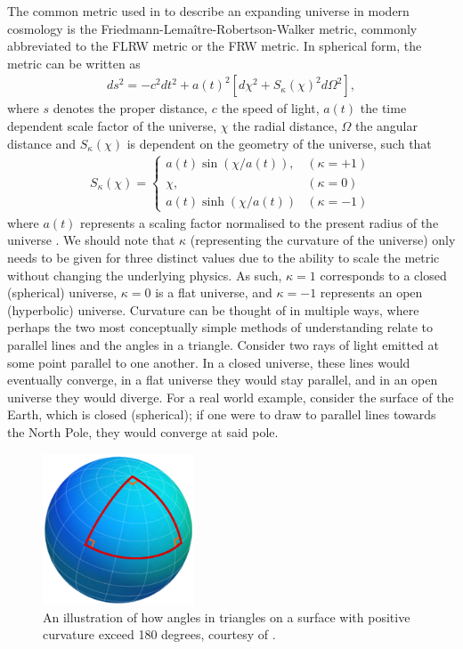 \documentclass[titlesmallcaps, examinerscopy, copyrightpage]{uqthesis}
\begin{document}
The common metric used in to describe an expanding universe in modern cosmology is the Friedmann-Lema\^itre-Robertson-Walker metric, commonly abbreviated to the FLRW metric or the FRW metric. In spherical form, the metric can be written as
\begin{align}
ds^2 = -c^2 dt^2 + a(t)^2 \left[ d\chi^2 + S_\kappa(\chi)^2 d\Omega^2 \right], 
\end{align}
where $s$ denotes the proper distance, $c$ the speed of light, $a(t)$ the time dependent scale factor of the universe, $\chi$ the radial distance, $\Omega$ the angular distance and $S_\kappa(\chi)$ is dependent on the geometry of the universe, such that
\begin{align}
S_\kappa(\chi) = \begin{cases}
    a(t) \sin(\chi/a(t)), & (\kappa = +1)\\
    \chi, & (\kappa = 0) \\
    a(t) \sinh (\chi/a(t)) & (\kappa = -1)
  \end{cases}
\end{align}
where $a(t)$ represents a scaling factor normalised to the present radius of the universe \citep{RydenPartridge2004}. We should note that $\kappa$ (representing the curvature of the universe) only needs to be given for three distinct values due to the ability to scale the metric without changing the underlying physics. As such, $\kappa = 1$ corresponds to a closed (spherical) universe, $\kappa = 0$ is a flat universe, and $\kappa = -1$ represents an open (hyperbolic) universe. Curvature can be thought of in multiple ways, where perhaps the two most conceptually simple methods of understanding relate to parallel lines and the angles in a triangle. Consider two rays of light emitted at some point parallel to one another. In a closed universe, these lines would eventually converge, in a flat universe they would stay parallel, and in an open universe they would diverge. For a real world example, consider the surface of the Earth, which is closed (spherical); if one were to draw to parallel lines towards the North Pole, they would converge at said pole. 
\begin{figure}
  \begin{center}
    \includegraphics[width=0.4\textwidth]{images/SphereRightAngle.png}
  \end{center}
  \caption{An illustration of how angles in triangles on a surface with positive curvature exceed 180 degrees, courtesy of \citet{LegnerMathigones}.}
  \label{fig:triangle}
\end{figure}
\end{document}
